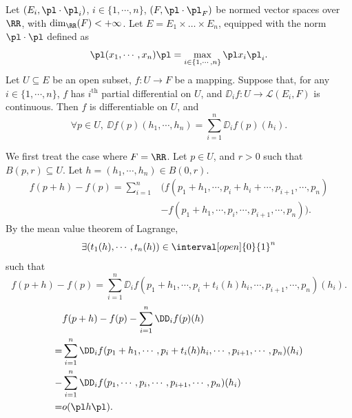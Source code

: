 \begin{propositionenv}
    Let $(E_i,\pl\cdot\pl_i)$, $i\in\{1,\cdots,n\}$, $(F,\pl\cdot\pl_F)$ be normed vector spaces over $\RR$, with $\dim _\RR(F)<+\infty$. Let $E=E_1\times\dots\times E_n$, equipped with the norm $\pl\cdot\pl$ defined as
    $$ \pl (x_1,\cdots,x_n)\pl=\max_{i\in \{1,\cdots,n\}}\pl x_i\pl_i.$$
    Let $U\subseteq E$ be an open subset, $f: U\longrightarrow F$ be a mapping.
    Suppose that, for any $i\in\{1,\cdots,n\}$, $f$ has $i^{\text{th}}$ partial differential on $U$, and $\DD_i f:U\longrightarrow \mathscr{L}(E_i,F) $ is continuous. Then $f$ is differentiable on $U$, and
    $$ \forall p\in U,\ \DD f(p)(h_1,\cdots,h_n)=\sum_{i=1}^{n} \DD_i f(p)(h_i).$$
\end{propositionenv}
\begin{proofenv}
    We first treat the case where $F=\RR$. Let $p\in U$, and $r>0$ such that $B(p,r)\subseteq U$. Let $h=(h_1,\cdots,h_n)\in B(0,r)$.
    \begin{align*}
        f(p+h)-f(p)=\sum_{i=1}^{n}&(f(p_1+h_1,\cdots,p_i+h_i+\cdots,p_{i+1},\cdots,p_n)\\
        &-f(p_1+h_1,\cdots,p_i,\cdots,p_{i+1},\cdots,p_n)).
    \end{align*}
    By the mean value theorem of Lagrange, 
    $$ \exists (t_1(h),\cdots,t_n(h))\in \interval[open]{0}{1}^n$$
    such that 
    $$ f(p+h)-f(p)=\sum_{i=1}^{n}\DD_i f(p_1+h_1,\cdots,p_i+t_i(h) h_i,\cdots,p_{i+1},\cdots,p_n)(h_i).$$
    \begin{align*}
        &f(p+h)-f(p)-\sum_{i=1}^{n}\DD_i f(p)(h)\\
        =&\sum_{i=1}^{n}\DD_i f(p_1+h_1,\cdots,p_i+t_i(h) h_i,\cdots,p_{i+1},\cdots,p_n)(h_i)\\
        -&\sum_{i=1}^{n}\DD_i f(p_1,\cdots,p_i,\cdots,p_{i+1},\cdots,p_n)(h_i)\\
        =& o(\pl h\pl).
    \end{align*}
\end{proofenv}
